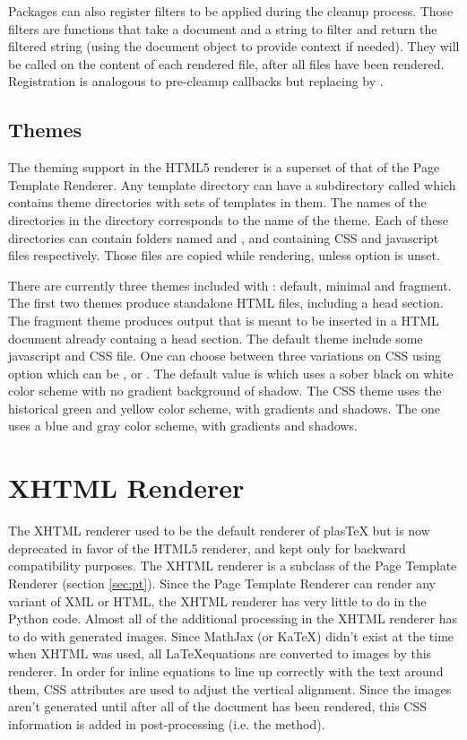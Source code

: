 Packages can also register filters to be applied during the cleanup
process. Those filters are functions that take a document and a string
to filter and return the filtered string (using the document object to
provide context if needed). They will be called on the content of each
rendered file, after all files have been rendered.  Registration is
analogous to pre-cleanup callbacks but replacing
 by .

\subsection{Themes}

The theming support in the HTML5 renderer is a superset of that of the
Page Template Renderer. Any template directory can have a subdirectory called
 which contains theme directories with sets of templates
in them.  The names of the directories in the  directory
corresponds to the name of the theme. Each of these directories can contain
folders named  and , and containing CSS and javascript files
respectively. Those files are copied while rendering, unless
option  is unset.

There are currently three themes included with \plasTeX: default, minimal and
fragment. The first two themes produce standalone HTML files, including a head
section. The fragment theme produces output that is meant to be inserted in a
HTML document already containg a head section. The default theme include some
javascript and CSS file. One can choose between three variations on CSS using
option  which can be ,  or
. The default value is  which uses a sober black on
white color scheme with no gradient background of shadow. The 
CSS theme uses the historical \plasTeX{} green and yellow color scheme, with
gradients and shadows. The  one uses a blue and gray color scheme,
with gradients and shadows.

\section{XHTML Renderer}

The XHTML renderer used to be the default renderer of plasTeX but is now
deprecated in favor of the HTML5 renderer, and kept only for
backward compatibility purposes.
The XHTML renderer is a subclass of the Page Template Renderer (section
\ref{sec:pt}). Since the Page Template Renderer can render any variant
of XML or HTML, the XHTML renderer has very little to do in the Python
code. Almost all of the additional processing in the XHTML renderer has
to do with generated images.
Since MathJax (or KaTeX) didn't exist at the time when XHTML was used,
all \LaTeX equations are converted to images by this renderer. In order
for inline equations to line up correctly with the text around them, CSS
attributes are used to adjust the vertical alignment.  Since the images
aren't generated until after all of the document has been rendered, this
CSS information is added in post-processing (i.e. the 
method).

